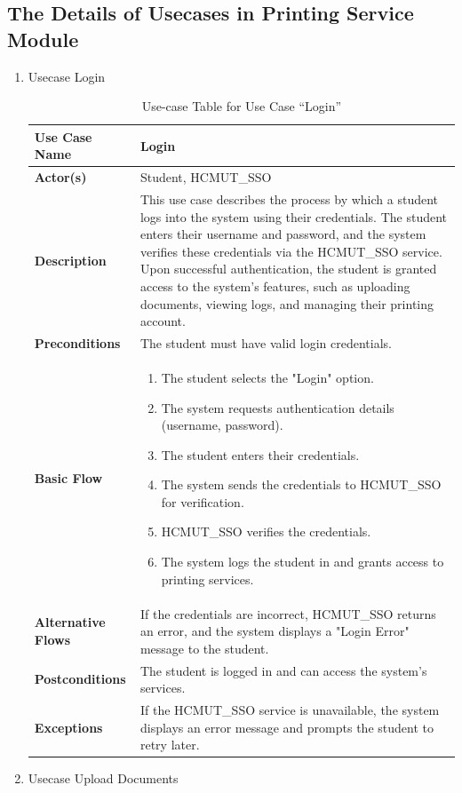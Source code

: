 \documentclass[a4paper]{report}
\begin{document}
\newpage
\subsection{The Details of Usecases in Printing Service Module}

\begin{enumerate}\bfseries
    \item Usecase Login
    
       \begin{table}[h!]
        \centering
        \renewcommand{\arraystretch}{1.8}
        \begin{tabular}{|>{\centering\arraybackslash}m{3cm}|>{\raggedright\arraybackslash}m{10cm}|}
        \hline
        \textbf{Use Case Name} & Login \\ \hline
        \textbf{Actor(s)} & Student, HCMUT\_SSO \\ \hline
        \textbf{Description} & This use case describes the process by which a student logs into the system using their credentials. The student enters their username and password, and the system verifies these credentials via the HCMUT\_SSO service. Upon successful authentication, the student is granted access to the system’s features, such as uploading documents, viewing logs, and managing their printing account. \\ \hline
        \textbf{Preconditions} & The student must have valid login credentials. \\ \hline [2ex]
        \textbf{Basic Flow} &
        \begin{enumerate}
            \item The student selects the "Login" option.
            \item The system requests authentication details (username, password).
            \item The student enters their credentials.
            \item The system sends the credentials to HCMUT\_SSO for verification.
            \item HCMUT\_SSO verifies the credentials.
            \item The system logs the student in and grants access to printing services.
        \end{enumerate} \\ \hline
        \textbf{Alternative Flows} & If the credentials are incorrect, HCMUT\_SSO returns an error, and the system displays a "Login Error" message to the student. \\ \hline
        \textbf{Postconditions} & The student is logged in and can access the system’s services. \\ \hline
        \textbf{Exceptions} & If the HCMUT\_SSO service is unavailable, the system displays an error message and prompts the student to retry later. \\ [2ex] \hline
        \end{tabular}
        \caption{Use-case Table for Use Case “Login”}
        \label{tab:login_use_case}
        \end{table}
    \newpage
    \item Usecase Upload Documents
    


\end{enumerate}
\end{document}
